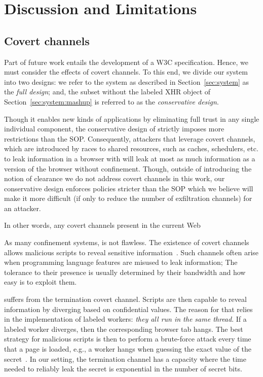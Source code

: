 \section{Discussion and Limitations}
\label{sec:discussion}


\subsection{Covert channels}
\label{sec:discussion:covert}

Part of future work entails the development of a W3C specification.
%
Hence, we must consider the effects of covert channels.
%
To this end, we divide our system into two designs:
%
we refer to the system as described in
Section~\ref{sec:system} as the \emph{full design};
and, the subset without the labeled XHR object of
Section~\ref{sec:system:mashup} is referred to as the
\emph{conservative design}.

Though it enables new kinds of applications by eliminating full trust
in any single individual component, the conservative design of \sys{}
strictly imposes more restrictions than the SOP.
%
Consequently, attackers that leverage covert channels, which are
introduced by races to shared resources, such as caches, schedulers,
etc. to leak information in a browser with \sys{} will leak at most as
much information as a version of the browser without confinement.
%
Though, outside of introducing the notion of clearance we do not
address covert channels in this work, our conservative design enforces
policies stricter than the SOP which we believe will make it more
difficult (if only to reduce the number of exfiltration channels) for
an attacker.


In other words, any covert channels present in the current Web

As many confinement systems, \sys{} is not flawless. The existence of covert
channels allows malicious scripts to reveal sensitive
information~\cite{lampson:confinement}.  Such channels often arise when
programming language features are misused to leak information; The tolerance to
their presence is usually determined by their bandwidth and how easy is to
exploit them.

\sys{} suffers from the termination covert channel. Scripts are then capable to
reveal information by diverging based on confidential values. The reason for
that relies in the implementation of labeled workers: \emph{they all run in the
  same thread}. If a labeled worker diverges, then the corresponding browser tab
hangs. The best strategy for malicious scripts is then to perform a brute-force
attack every time that a page is loaded, e.g., a worker hangs when guessing the
exact value of the secret~\cite{askarov:termination-insensitive}. In our
setting, the termination channel has a capacity where the time needed to reliably
leak the secret is exponential in the number of secret bits.


